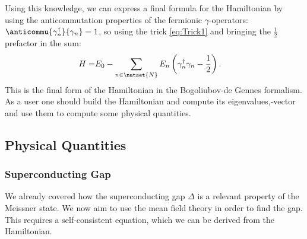 \documentclass[../main.tex]{subfile}
\begin{document}
Using this knowledge, we can express a final formula for the Hamiltonian by using the anticommutation properties of the fermionic $\gamma$-operators:
 $\anticommu{\gamma^{\dagger}_n}{\gamma_{n}} = 1$, so using the trick \ref{eq:Trick1} and bringing the $\frac{1}{2}$ prefactor in the sum:
\begin{align}
    H =& E_0 - \sum_{n\in \natset{N}} E_n \left( \gamma_n^{\dagger}\gamma_n - \frac{1}{2}\right).
\end{align}
This is the final form of the Hamiltonian in the Bogoliubov-de Gennes formalism. As a user one should build the Hamiltonian 
and compute its eigenvalues,-vector and use them to compute some physical quantities.\\
\subsection{Physical Quantities}
\subsubsection{Superconducting Gap}
We already covered how the superconducting gap $\Delta$ is a relevant property of the Meissner state. We now aim to use the  mean field 
theory in order to find the gap. This requires a self-consistent equation, which we can be derived from the Hamiltonian.\\ 
\end{document}

